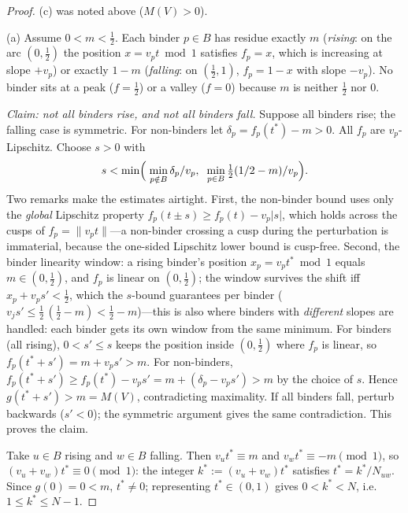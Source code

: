 \documentclass[11pt,a4paper]{article}
\numberwithin{equation}{section}
\theoremstyle{plain}
\theoremstyle{definition}
\theoremstyle{remark}
\newcommand{\wnc}[1]{\lVert #1 \rVert}
\begin{document}
\begin{proof}
(c) was noted above ($M(V)>0$).

(a) Assume $0<m<\tfrac12$. Each binder $p\in B$ has residue exactly $m$
(\emph{rising}: on the arc $(0,\tfrac12)$ the position $x=v_p t\bmod 1$
satisfies $f_p=x$, which is increasing at slope $+v_p$) or exactly $1-m$
(\emph{falling}: on $(\tfrac12,1)$, $f_p=1-x$ with slope $-v_p$). No
binder sits at a peak ($f=\tfrac12$) or a valley ($f=0$) because $m$ is
neither $\tfrac12$ nor $0$.

\emph{Claim: not all binders rise, and not all binders fall.} Suppose all
binders rise; the falling case is symmetric. For non-binders let
$\delta_p=f_p(t^\ast)-m>0$. All $f_p$ are $v_p$-Lipschitz. Choose
$s>0$ with
\[
s<\min\Bigl(\;\min_{p\notin B}\delta_p/v_p,\;\;
                \min_{p\in B}\tfrac{1}{2}(1/2-m)/v_p\Bigr).
\]
Two remarks make the estimates airtight. First, the non-binder bound
uses only the \emph{global} Lipschitz property
$f_p(t\pm s)\ge f_p(t)-v_p|s|$, which holds across the cusps of
$f_p=\wnc{v_pt}$---a non-binder crossing a cusp during the
perturbation is immaterial, because the one-sided Lipschitz lower
bound is cusp-free. Second, the binder linearity window: a rising
binder's position $x_p=v_pt^\ast\bmod 1$ equals $m\in(0,\tfrac12)$,
and $f_p$ is linear on $(0,\tfrac12)$; the window survives the shift
iff $x_p+v_ps'<\tfrac12$, which the $s$-bound guarantees per binder
($v_js'\le\tfrac12\,(\tfrac12-m)<\tfrac12-m$)---this is also where
binders with \emph{different} slopes are handled: each binder gets its
own window from the same minimum.
For binders (all rising), $0<s'\le s$ keeps the position inside
$(0,\tfrac12)$ where $f_p$ is linear, so
$f_p(t^\ast+s')=m+v_p s'>m$. For non-binders,
$f_p(t^\ast+s')\ge f_p(t^\ast)-v_p s'=m+(\delta_p-v_p s')>m$ by the
choice of $s$. Hence $g(t^\ast+s')>m=M(V)$, contradicting maximality. If
all binders fall, perturb backwards ($s'<0$); the symmetric argument gives
the same contradiction. This proves the claim.

Take $u\in B$ rising and $w\in B$ falling. Then
$v_u t^\ast\equiv m$ and $v_w t^\ast\equiv -m \pmod 1$, so
$(v_u+v_w)t^\ast\equiv 0 \pmod 1$: the integer
$k^\ast:=(v_u+v_w)t^\ast$ satisfies $t^\ast=k^\ast/N_{uw}$. Since
$g(0)=0<m$, $t^\ast\ne 0$; representing $t^\ast\in(0,1)$ gives
$0<k^\ast<N$, i.e.\ $1\le k^\ast\le N-1$.

\end{proof}
\end{document}

